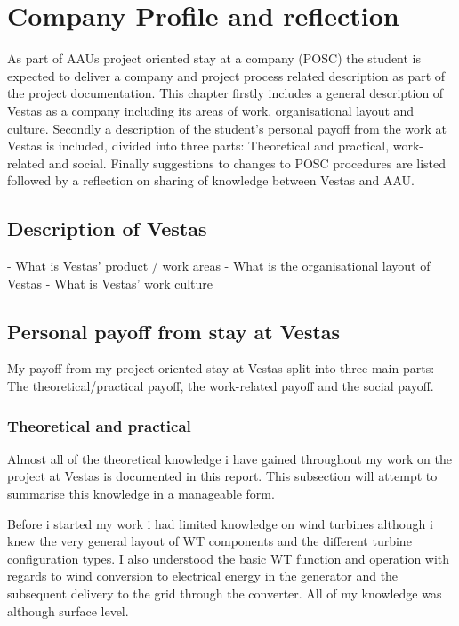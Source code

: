 \section{Company Profile and reflection} \label{company}
As part of AAUs project oriented stay at a company (POSC) the student is expected to deliver a company and project process related description as part of the project documentation. This chapter firstly includes a general description of Vestas as a company including its areas of work, organisational layout and culture. Secondly a description of the student's personal payoff from the work at Vestas is included, divided into three parts: Theoretical and practical, work-related and social. Finally suggestions to changes to POSC procedures are listed followed by a reflection on sharing of knowledge between Vestas and AAU.


\subsection{Description of Vestas}

- What is Vestas' product / work areas
- What is the organisational layout of Vestas
- What is Vestas' work culture



\subsection{Personal payoff from stay at Vestas}
My payoff from my project oriented stay at Vestas split into three main parts: The theoretical/practical payoff, the work-related payoff and the social payoff.



\subsubsection{Theoretical and practical}
Almost all of the theoretical knowledge i have gained throughout my work on the project at Vestas is documented in this report. This subsection will attempt to summarise this knowledge in a manageable form.

\smallskip
Before i started my work i had limited knowledge on wind turbines although i knew the very general layout of WT components and the different turbine configuration types. I also understood the basic WT function and operation with regards to wind conversion to electrical energy in the generator and the subsequent delivery to the grid through the converter. All of my knowledge was although surface level.

